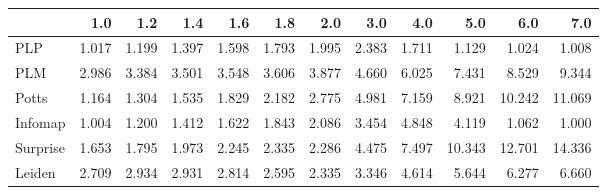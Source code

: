 \begin{tabular}{lrrrrrrrrrrr}
\toprule
{} &   1.0 &   1.2 &   1.4 &   1.6 &   1.8 &   2.0 &   3.0 &   4.0 &    5.0 &    6.0 &    7.0 \\
\midrule
PLP      & 1.017 & 1.199 & 1.397 & 1.598 & 1.793 & 1.995 & 2.383 & 1.711 &  1.129 &  1.024 &  1.008 \\
PLM      & 2.986 & 3.384 & 3.501 & 3.548 & 3.606 & 3.877 & 4.660 & 6.025 &  7.431 &  8.529 &  9.344 \\
Potts    & 1.164 & 1.304 & 1.535 & 1.829 & 2.182 & 2.775 & 4.981 & 7.159 &  8.921 & 10.242 & 11.069 \\
Infomap  & 1.004 & 1.200 & 1.412 & 1.622 & 1.843 & 2.086 & 3.454 & 4.848 &  4.119 &  1.062 &  1.000 \\
Surprise & 1.653 & 1.795 & 1.973 & 2.245 & 2.335 & 2.286 & 4.475 & 7.497 & 10.343 & 12.701 & 14.336 \\
Leiden   & 2.709 & 2.934 & 2.931 & 2.814 & 2.595 & 2.335 & 3.346 & 4.614 &  5.644 &  6.277 &  6.660 \\
\bottomrule
\end{tabular}
